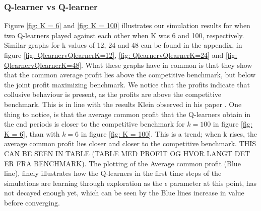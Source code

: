 \documentclass{article}
\begin{document}
\subsubsection{Q-learner vs Q-learner}
Figure \ref{fig: K = 6} and \ref{fig: K = 100} illustrates our simulation results for when two Q-learners played against each other when K was 6 and 100, respectively. Similar graphs for k values of 12, 24 and 48 can be found in the appendix, in figure \ref{fig: QlearnervQlearnerK=12}, \ref{fig: QlearnervQlearnerK=24} and \ref{fig: QlearnervQlearnerK=48}. What these graphs have in common is that they show that the common average profit lies above the competitive benchmark, but below the joint profit maximizing benchmark. We notice that the profits indicate that collusive behaviour is present, as the profits are above the competitive benchmark. This is in line with the results Klein observed in his paper \cite{Klein2021}.
One thing to notice, is that the average common profit that the Q-learners obtain in the end periods is closer to the competitive benchmark for $k = 100$ in figure \ref{fig: K = 6}, than with $k = 6$ in figure \ref{fig: K = 100}. This is a trend; when k rises, the average common profit lies closer and closer to the competitive benchmark. THIS CAN BE SEEN IN TABLE (TABLE MED PROFIT OG HVOR LANGT DET ER FRA BENCHMARK).
The plotting of the Average common profit (Blue line), finely illustrates how the Q-learners in the first time steps of the simulations are learning through exploration as the $\epsilon$ parameter at this point, has not decayed enough yet, which can be seen by the Blue lines increase in value before converging. 
\end{document}
